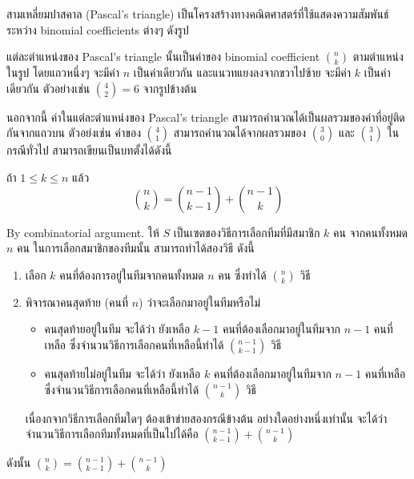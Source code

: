 \begin{example}
สามเหลี่ยมปาสคาล (Pascal's triangle) เป็นโครงสร้างทางคณิตศาสตร์ที่ใช้แสดงความสัมพันธ์ระหว่าง binomial coefficients ต่างๆ ดังรูป
\begin{center}
\end{center}
แต่ละตำแหน่งของ Pascal's triangle นั้นเป็นค่าของ binomial coefficient $\binom{n}{k}$ ตามตำแหน่งในรูป \enskip โดยแถวหนึ่งๆ จะมีค่า $n$ เป็นค่าเดียวกัน และแนวทแยงลงจากขวาไปซ้าย จะมีค่า $k$ เป็นค่าเดียวกัน ตัวอย่างเช่น $\binom{4}{2}=6$ จากรูปข้างต้น

นอกจากนี้ ค่าในแต่ละตำแหน่งของ Pascal's triangle สามารถคำนวณได้เป็นผลรวมของค่าที่อยู่ติดกันจากแถวบน \enskip ตัวอย่งเช่น ค่าของ $\binom{4}{1}$ สามารถคำนวณได้จากผลรวมของ $\binom{3}{0}$ และ $\binom{3}{1}$ \enskip ในกรณีทั่วไป สามารถเขียนเป็นบทตั้งได้ดังนี้

\begin{lemma}
ถ้า $1\leq k\leq n$ แล้ว
\[\binom{n}{k}=\binom{n-1}{k-1}+\binom{n-1}{k}\]
\begin{pf}
By combinatorial argument. \enskip ให้ $S$ เป็นเซตของวิธีการเลือกทีมที่มีสมาชิก $k$ คน จากคนทั้งหมด $n$ คน \enskip ในการเลือกสมาชิกของทีมนั้น สามารถทำได้สองวิธี ดังนี้
\begin{enumerate}[]
\item เลือก $k$ คนที่ต้องการอยู่ในทีมจากคนทั้งหมด $n$ คน ซึ่งทำได้ $\binom{n}{k}$ วิธี
\item พิจารณาคนสุดท้าย (คนที่ $n$) ว่าจะเลือกมาอยู่ในทีมหรือไม่
\begin{itemize}[]
\item คนสุดท้ายอยู่ในทีม จะได้ว่า ยังเหลือ $k-1$ คนที่ต้องเลือกมาอยู่ในทีมจาก $n-1$ คนที่เหลือ ซึ่งจำนวนวิธีการเลือกคนที่เหลือนี้ทำได้ $\binom{n-1}{k-1}$ วิธี
\item คนสุดท้ายไม่อยู่ในทีม จะได้ว่า ยังเหลือ $k$ คนที่ต้องเลือกมาอยู่ในทีมจาก $n-1$ คนที่เหลือ ซึ่งจำนวนวิธีการเลือกคนที่เหลือนี้ทำได้ $\binom{n-1}{k}$ วิธี
\end{itemize}
เนื่องกจากวิธีการเลือกทีมใดๆ ต้องเข้าข่ายสองกรณีข้างต้น อย่างใดอย่างหนึ่งเท่านั้น จะได้ว่า จำนวนวิธีการเลือกทีมทั้งหมดที่เป็นไปได้คือ $\binom{n-1}{k-1}+\binom{n-1}{k}$
\end{enumerate}
ดังนั้น $\binom{n}{k}=\binom{n-1}{k-1}+\binom{n-1}{k}$
\end{pf}
\end{lemma}
\end{example}

